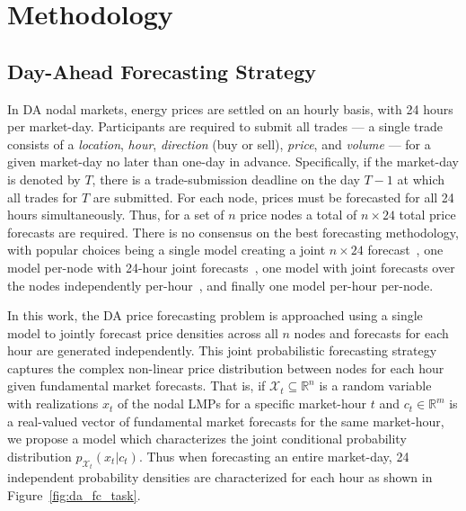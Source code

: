 \chapter{Methodology}\label{ch:methodology}

\section{Day-Ahead Forecasting Strategy}\label{sec:proposed-methods}

In DA nodal markets, energy prices are settled on an hourly basis, with 24 hours per market-day.
Participants are required to submit all trades --- a single trade consists of a \textit{location}, \textit{hour},
\textit{direction} (buy or sell), \textit{price}, and \textit{volume} --- for a given market-day no later than one-day
in advance.
Specifically, if the market-day is denoted by $T$, there is a trade-submission deadline on the day $T-1$ at which all
trades for $T$ are submitted.
For each node, prices must be forecasted for all 24 hours simultaneously.
Thus, for a set of $n$ price nodes a total of $n \times 24$ total price forecasts are required.
There is no consensus on the best forecasting methodology, with popular choices being
a single model creating a joint $n \times 24$ forecast~\cite{9520248, 9916722},
one model per-node with 24-hour joint forecasts~\cite{00000, 7744689, LAGO2018386},
one model with joint forecasts over the nodes independently per-hour~\cite{5741753, 7478156, 8733097},
and finally one model per-hour per-node\cite{en9080621}.

In this work, the DA price forecasting problem is approached using a single model to jointly forecast price densities
across all $n$ nodes and forecasts for each hour are generated independently.
This joint probabilistic forecasting strategy captures the complex non-linear price distribution between nodes for each
hour given fundamental market forecasts.
That is, if $\mathcal{X}_t \subseteq \mathbb{R}^n$ is a random variable with realizations $x_t$ of the nodal LMPs for a
specific market-hour $t$ and $c_t \in \mathbb{R}^m$ is a real-valued vector of fundamental market forecasts for the
same market-hour, we propose a model which characterizes the joint conditional probability distribution
 $p_{\mathcal{X}_t}(x_t | c_t)$.
Thus when forecasting an entire market-day, 24 independent probability densities are characterized for each hour as
shown in Figure~\ref{fig:da_fc_task}.

